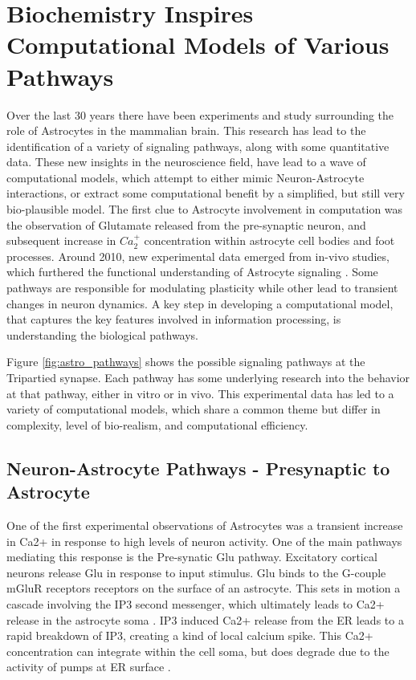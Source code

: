     
    \section{Biochemistry Inspires Computational Models of Various Pathways}
    Over the last 30 years there have been experiments and study surrounding the
    role of Astrocytes in the mammalian brain. This research has lead to the
    identification of a variety of signaling pathways, along with some
    quantitative data. These new insights in the neuroscience field, have lead
    to a wave of computational models, which attempt to either mimic
    Neuron-Astrocyte interactions, or extract some computational benefit by a
    simplified, but still very bio-plausible model. The first clue to Astrocyte
    involvement in computation was the observation of Glutamate released from
    the pre-synaptic neuron, and subsequent increase in $Ca_2^+$
    concentration within astrocyte cell bodies and foot processes. Around 2010,
    new experimental data emerged from in-vivo studies, which furthered the
    functional understanding of Astrocyte signaling \cite{manninen_2018}. Some
    pathways are responsible for modulating plasticity while other lead to
    transient changes in neuron dynamics. A key step in developing a
    computational model, that captures the key features involved in information
    processing, is understanding the biological pathways.


    
    Figure \ref{fig:astro_pathways} shows the possible signaling pathways at the
    Tripartied synapse. Each pathway has some underlying research into the
    behavior at that pathway, either in vitro or in vivo. This experimental data
    has led to a variety of computational models, which share a common theme but
    differ in complexity, level of bio-realism, and computational efficiency.

    \subsection{Neuron-Astrocyte Pathways - Presynaptic to Astrocyte}

    One of the first experimental observations of Astrocytes was a transient
    increase in Ca2+ in response to high levels of neuron activity. One of the
    main pathways mediating this response is the Pre-synatic Glu
    pathway. Excitatory cortical neurons release Glu in response to input
    stimulus. Glu binds to the G-couple mGluR receptors receptors on the surface
    of an astrocyte. This sets in motion a cascade involving the IP3 second
    messenger, which ultimately leads to Ca2+ release in the astrocyte soma
    \cite{pitta_2012}. IP3 induced Ca2+ release from the ER leads to a rapid
    breakdown of IP3, creating a kind of local calcium spike. This Ca2+
    concentration can integrate within the cell soma, but does degrade due to
    the activity of pumps at ER surface \cite{pitta_2012}.

